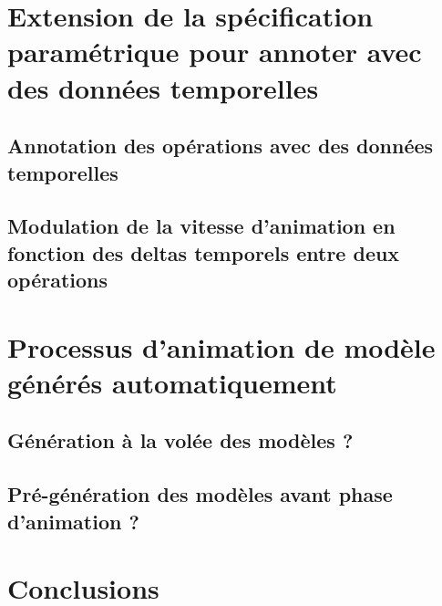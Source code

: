 \documentclass[11pt]{article}
\begin{document}
\section{Extension de la spécification paramétrique pour annoter avec des données temporelles}
\label{sec:orga1b49b7}
\subsection{Annotation des opérations avec des données temporelles}
\label{sec:org4989b61}
\subsection{Modulation de la vitesse d'animation en fonction des deltas temporels entre deux opérations}
\label{sec:org5713109}
\section{Processus d'animation de modèle générés automatiquement}
\label{sec:orga762e91}
\subsection{Génération à la volée des modèles ?}
\label{sec:orgf9698a3}
\subsection{Pré-génération des modèles avant phase d'animation ?}
\label{sec:orgaa2b428}
\section{Conclusions}
\label{sec:org43bf11d}
\end{document}
